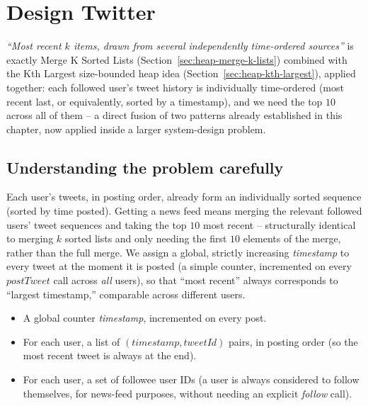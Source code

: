 \section{Design Twitter}
\label{sec:heap-design-twitter}


\begin{patternbox}
\emph{``Most recent $k$ items, drawn from several independently
time-ordered sources''} is exactly Merge K Sorted Lists
(Section~\ref{sec:heap-merge-k-lists}) combined with the Kth Largest
size-bounded heap idea (Section~\ref{sec:heap-kth-largest}), applied
together: each followed user's tweet history is individually
time-ordered (most recent last, or equivalently, sorted by a timestamp),
and we need the top $10$ across all of them -- a direct fusion of two
patterns already established in this chapter, now applied inside a larger
system-design problem.
\end{patternbox}

\subsection*{Understanding the problem carefully}

Each user's tweets, in posting order, already form an individually sorted
sequence (sorted by time posted). Getting a news feed means merging the
relevant followed users' tweet sequences and taking the top $10$ most
recent -- structurally identical to merging $k$ sorted lists and only
needing the first $10$ elements of the merge, rather than the full merge.
We assign a global, strictly increasing \textit{timestamp} to every tweet
at the moment it is posted (a simple counter, incremented on every
$\textit{postTweet}$ call across \emph{all} users), so that ``most
recent'' always corresponds to ``largest timestamp,'' comparable across
different users.

\begin{ideabox}
\begin{itemize}
  \item A global counter \textit{timestamp}, incremented on every post.
  \item For each user, a list of $(\textit{timestamp}, \textit{tweetId})$
        pairs, in posting order (so the most recent tweet is always at
        the end).
  \item For each user, a set of followee user IDs (a user is always
        considered to follow themselves, for news-feed purposes, without
        needing an explicit \textit{follow} call).
\end{itemize}
\end{ideabox}

